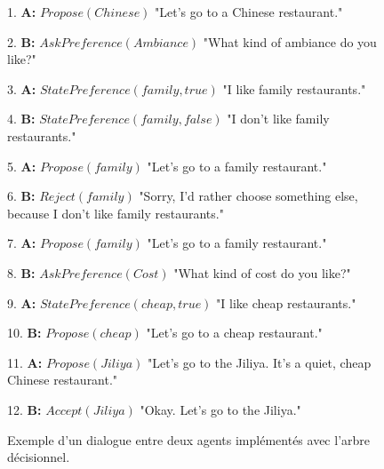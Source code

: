 	\begin{figure} [t]
		\begin{minipage}{.95\textwidth}
		{\ttfamily
			\linenumbers
			\begin{addmargin}[1em]{2em}%
			\vspace{0.5em}			 	
			1.	\textbf{A:} $Propose(Chinese)$ "Let's go to a Chinese \hspace*{3mm} restaurant."
				
			2.	 \hspace*{3mm} \textbf{B:} $AskPreference(Ambiance)$  "What kind of \hspace*{4mm} ambiance do you like?"
				
			3.	\textbf{A:} $StatePreference(family,true)$ "I like family  \hspace*{3mm} restaurants."
				
			4.	\hspace*{3mm} 	\textbf{B:}  $StatePreference(family,false)$ "I don't like \hspace*{4mm} family restaurants."
				
			5.	\textbf{A:}  $Propose(family)$ "Let's go to a family \hspace*{3mm} restaurant."
				
			6.	\hspace*{3mm} 	\textbf{B:} $Reject(family)$ "Sorry, I'd rather choose \hspace*{4mm} something else, because I don't like family \hspace*{4mm} restaurants."
				
			7.	\textbf{A:}  $Propose(family)$ "Let's go to a family \hspace*{3mm} \hspace*{3mm} restaurant."
				
			8.	\hspace*{3mm} 	\textbf{B:} $AskPreference(Cost)$ "What kind of cost do \hspace*{3mm} you like?"
				
			9.	\textbf{A:} $StatePreference(cheap,true)$ "I like cheap \hspace*{3mm} restaurants."
				
			10.	\hspace*{3mm} 	\textbf{B:} $Propose(cheap)$ "Let's go to a cheap \hspace*{4mm} restaurant."
				
			11.	\textbf{A:}  $Propose(Jiliya)$ "Let's go to the Jiliya. It's \hspace*{3mm} a quiet, cheap Chinese restaurant."
				
			12.	\hspace*{3mm} 	\textbf{B:} $Accept(Jiliya)$  "Okay. Let's go to the Jiliya."
			\end{addmargin}
		} 
	\end{minipage}
	\caption{\label{fig:ex-dialogue} Exemple d'un dialogue entre deux agents implémentés avec l'arbre décisionnel.}
\end{figure}
